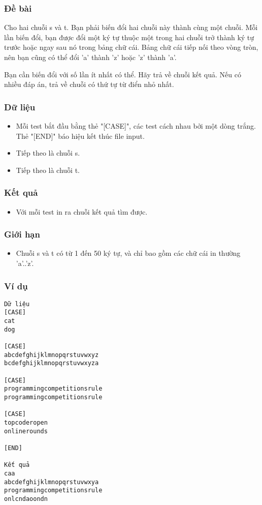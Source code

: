 



\subsubsection{   Đề bài  }

   Cho hai chuỗi s và t. Bạn phải biến đổi hai chuỗi này thành cùng một chuỗi. Mỗi lần biến đổi, bạn được đổi một ký tự thuộc một trong hai chuỗi trở thành ký tự trước hoặc ngay sau nó trong bảng chữ cái. Bảng chữ cái tiếp nối theo vòng tròn, nên bạn cũng có thể đổi 'a' thành 'z' hoặc 'z' thành 'a'.  

   Bạn cần biến đổi với số lần ít nhất có thể. Hãy trả về chuỗi kết quả. Nếu có nhiều đáp án, trả về chuỗi có thứ tự từ điển nhỏ nhất.  

\subsubsection{   Dữ liệu  }
\begin{itemize}
	\item     Mỗi test bắt đầu bằng thẻ "[CASE]", các test cách nhau bởi một dòng trắng. Thẻ "[END]" báo hiệu kết thúc file input.   
	\item     Tiếp theo là chuỗi s.   
	\item     Tiếp theo là chuỗi t.   
\end{itemize}

\subsubsection{   Kết quả  }
\begin{itemize}
	\item     Với mỗi test in ra chuỗi kết quả tìm được.   
\end{itemize}

\subsubsection{   Giới hạn  }
\begin{itemize}
	\item     Chuỗi s và t có từ 1 đến 50 ký tự, và chỉ bao gồm các chữ cái in thường 'a'..'z'.   
\end{itemize}

\subsubsection{   Ví dụ  }
\begin{verbatim}
Dữ liệu
[CASE]
cat
dog

[CASE]
abcdefghijklmnopqrstuvwxyz
bcdefghijklmnopqrstuvwxyza

[CASE]
programmingcompetitionsrule
programmingcompetitionsrule

[CASE]
topcoderopen
onlinerounds

[END]

Kết quả
caa
abcdefghijklmnopqrstuvwxya
programmingcompetitionsrule
onlcndaoondn
\end{verbatim}